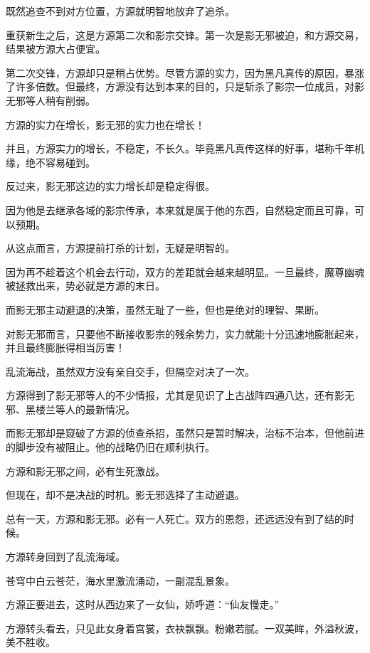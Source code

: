 
\begin{this_body}



既然追查不到对方位置，方源就明智地放弃了追杀。

重获新生之后，这是方源第二次和影宗交锋。第一次是影无邪被迫，和方源交易，结果被方源大占便宜。

第二次交锋，方源却只是稍占优势。尽管方源的实力，因为黑凡真传的原因，暴涨了许多倍数。但最终，方源没有达到本来的目的，只是斩杀了影宗一位成员，对影无邪等人稍有削弱。

方源的实力在增长，影无邪的实力也在增长！

并且，方源实力的增长，不稳定，不长久。毕竟黑凡真传这样的好事，堪称千年机缘，绝不容易碰到。

反过来，影无邪这边的实力增长却是稳定得很。

因为他是去继承各域的影宗传承，本来就是属于他的东西，自然稳定而且可靠，可以预期。

从这点而言，方源提前打杀的计划，无疑是明智的。

因为再不趁着这个机会去行动，双方的差距就会越来越明显。一旦最终，魔尊幽魂被拯救出来，势必就是方源的末日。

而影无邪主动避退的决策，虽然无耻了一些，但也是绝对的理智、果断。

对影无邪而言，只要他不断接收影宗的残余势力，实力就能十分迅速地膨胀起来，并且最终膨胀得相当厉害！

乱流海战，虽然双方没有亲自交手，但隔空对决了一次。

方源得到了影无邪等人的不少情报，尤其是见识了上古战阵四通八达，还有影无邪、黑楼兰等人的最新情况。

而影无邪却是窥破了方源的侦查杀招，虽然只是暂时解决，治标不治本，但他前进的脚步没有被阻止。他的战略仍旧在顺利执行。

方源和影无邪之间，必有生死激战。

但现在，却不是决战的时机。影无邪选择了主动避退。

总有一天，方源和影无邪。必有一人死亡。双方的恩怨，还远远没有到了结的时候。

方源转身回到了乱流海域。

苍穹中白云苍茫，海水里激流涌动，一副混乱景象。

方源正要进去，这时从西边来了一女仙，娇呼道：“仙友慢走。”

方源转头看去，只见此女身着宫裳，衣袂飘飘。粉嫩若腻。一双美眸，外溢秋波，美不胜收。


\end{this_body}
